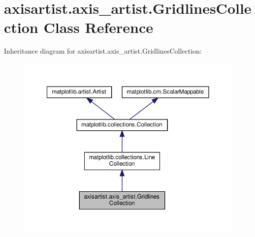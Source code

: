 \hypertarget{classaxisartist_1_1axis__artist_1_1GridlinesCollection}{}\section{axisartist.\+axis\+\_\+artist.\+Gridlines\+Collection Class Reference}
\label{classaxisartist_1_1axis__artist_1_1GridlinesCollection}


Inheritance diagram for axisartist.\+axis\+\_\+artist.\+Gridlines\+Collection\+:
\nopagebreak
\begin{figure}[H]
\begin{center}
\leavevmode
\includegraphics[width=350pt]{classaxisartist_1_1axis__artist_1_1GridlinesCollection__inherit__graph}
\end{center}
\end{figure}


